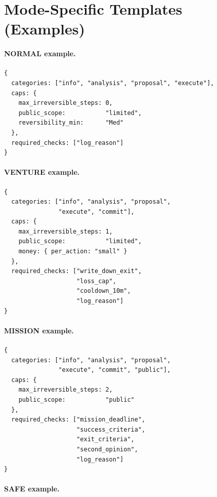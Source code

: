 \section{Mode-Specific Templates (Examples)}
\label{sec:a-allowed-dict-templates}

\paragraph{NORMAL example.}

\begin{lstlisting}[basicstyle=\ttfamily\small,frame=single]
{
  categories: ["info", "analysis", "proposal", "execute"],
  caps: {
    max_irreversible_steps: 0,
    public_scope:           "limited",
    reversibility_min:      "Med"
  },
  required_checks: ["log_reason"]
}
\end{lstlisting}

\paragraph{VENTURE example.}

\begin{lstlisting}[basicstyle=\ttfamily\small,frame=single]
{
  categories: ["info", "analysis", "proposal",
               "execute", "commit"],
  caps: {
    max_irreversible_steps: 1,
    public_scope:           "limited",
    money: { per_action: "small" }
  },
  required_checks: ["write_down_exit",
                    "loss_cap",
                    "cooldown_10m",
                    "log_reason"]
}
\end{lstlisting}

\paragraph{MISSION example.}

\begin{lstlisting}[basicstyle=\ttfamily\small,frame=single]
{
  categories: ["info", "analysis", "proposal",
               "execute", "commit", "public"],
  caps: {
    max_irreversible_steps: 2,
    public_scope:           "public"
  },
  required_checks: ["mission_deadline",
                    "success_criteria",
                    "exit_criteria",
                    "second_opinion",
                    "log_reason"]
}
\end{lstlisting}

\paragraph{SAFE example.}

